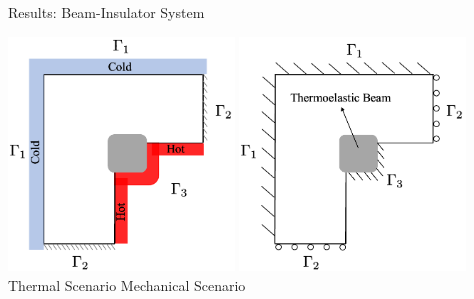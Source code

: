 \documentclass[10pt,xcolor=dvipsnames,compress]{beamer}
\begin{document}
\begin{frame}{Results: Beam-Insulator System}
\centering
\begin{center}
    \includegraphics[width=0.45\textwidth]{Figures/Thermal_BC_IB2.png}\hspace{0.1 in}
    \includegraphics[width=0.45\textwidth]{Figures/Mechanical_BC_IB2.png}\\
    Thermal Scenario \hspace{1.2 in} Mechanical Scenario\\
\end{center}
\end{frame}
\end{document}
